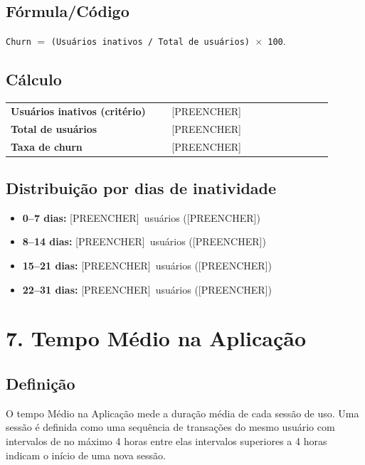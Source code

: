 \documentclass[12pt]{article}
\providecommand{\ChurnInativos}{[PREENCHER]}
\providecommand{\ChurnTotalUsuarios}{[PREENCHER]}
\providecommand{\ChurnTaxa}{[PREENCHER]}
\providecommand{\InatA}{[PREENCHER]}\providecommand{\InatAperc}{[PREENCHER]}
\providecommand{\InatB}{[PREENCHER]}\providecommand{\InatBperc}{[PREENCHER]}
\providecommand{\InatC}{[PREENCHER]}\providecommand{\InatCperc}{[PREENCHER]}
\providecommand{\InatD}{[PREENCHER]}\providecommand{\InatDperc}{[PREENCHER]}
\begin{document}
\subsection*{Fórmula/Código}
\noindent \texttt{Churn} $=$ \texttt{(Usuários inativos / Total de usuários) $\times$ 100}.

\subsection*{Cálculo}
\begin{center}
\begin{tabular}{>{\bfseries}p{0.45\linewidth} p{0.45\linewidth}}
\toprule
Usuários inativos (critério) & \ChurnInativos \\
Total de usuários & \ChurnTotalUsuarios \\
Taxa de churn & \ChurnTaxa \\
\bottomrule
\end{tabular}
\end{center}

\subsection*{Distribuição por dias de inatividade}
\begin{itemize}
  \item \textbf{0--7 dias:} \InatA\ usuários (\InatAperc)
  \item \textbf{8--14 dias:} \InatB\ usuários (\InatBperc)
  \item \textbf{15--21 dias:} \InatC\ usuários (\InatCperc)
  \item \textbf{22--31 dias:} \InatD\ usuários (\InatDperc)
\end{itemize}

\section*{7. Tempo Médio na Aplicação}
\subsection*{Definição}
O tempo Médio na Aplicação mede a duração média de cada sessão de uso. Uma sessão é definida como uma sequência de transações do mesmo usuário com intervalos de no máximo 4 horas entre elas intervalos superiores a 4 horas indicam o início de uma nova sessão.
\end{document}
